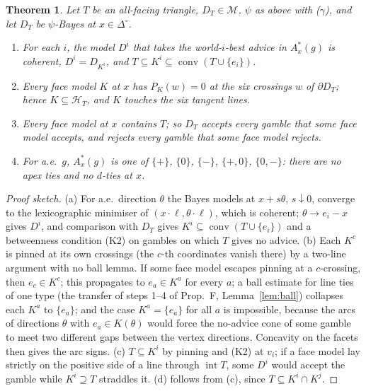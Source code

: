 \documentclass[11pt]{article}
\newtheorem{theorem}{Theorem}[section]
\theoremstyle{definition}
\theoremstyle{remark}
\newcommand{\Di}{\Delta^{\circ}}
\newcommand{\M}{\mathcal M}
\newcommand{\co}{\operatorname{conv}}
\begin{document}
\begin{theorem}\label{thm:B21}
Let $T$ be an all-facing triangle, $D_T\in\M$, $\psi$ as above with ($\gamma$), and let $D_T$ be $\psi$-Bayes at $x\in\Di$.
\begin{enumerate}[leftmargin=*,label=(\alph*)]
\item For each $i$, the model $D^i$ that takes the world-$i$-best advice in $A^*_x(g)$ is coherent, $D^i=D_{K^i}$, and $T\subseteq K^i\subseteq\co(T\cup\{e_i\})$.
\item Every face model $K$ at $x$ has $P_K(w)=0$ at the six crossings $w$ of $\partial D_T$; hence $K\subseteq\mathcal H_T$, and $K$ touches the six tangent lines.
\item Every face model at $x$ contains $T$; so $D_T$ accepts every gamble that some face model accepts, and rejects every gamble that some face model rejects.
\item For a.e.\ $g$, $A^*_x(g)$ is one of $\{+\}$, $\{0\}$, $\{-\}$, $\{+,0\}$, $\{0,-\}$: there are no apex ties and no $d$-ties at $x$.
\end{enumerate}
\end{theorem}
\begin{proof}[Proof sketch]
(a) For a.e.\ direction $\theta$ the Bayes models at $x+s\theta$, $s\downarrow0$, converge to the lexicographic minimiser of $(x\cdot\ell,\theta\cdot\ell)$, which is coherent; $\theta\to e_i-x$ gives $D^i$, and comparison with $D_T$ gives $K^i\subseteq\co(T\cup\{e_i\})$ and a betweenness condition (K2) on gambles on which $T$ gives no advice. (b) Each $K^c$ is pinned at its own crossings (the $c$-th coordinates vanish there) by a two-line argument with no ball lemma. If some face model escapes pinning at a $c$-crossing, then $e_c\in K^c$; this propagates to $e_a\in K^a$ for every $a$; a ball estimate for line ties of one type (the transfer of steps 1--4 of Prop.~F, Lemma~\ref{lem:ball}) collapses each $K^a$ to $\{e_a\}$; and the case $K^a=\{e_a\}$ for all $a$ is impossible, because the arcs of directions $\theta$ with $e_a\in K(\theta)$ would force the no-advice cone of some gamble to meet two different gaps between the vertex directions. Concavity on the facets then gives the arc signs. (c) $T\subseteq K^i$ by pinning and (K2) at $v_i$; if a face model lay strictly on the positive side of a line through $\operatorname{int}T$, some $D^i$ would accept the gamble while $K^i\supseteq T$ straddles it. (d) follows from (c), since $T\subseteq K^i\cap K^j$.
\end{proof}
\end{document}

